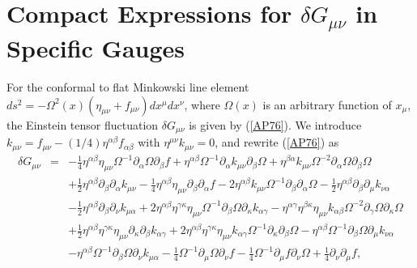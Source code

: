 \section{Compact Expressions for $\delta G_{\mu\nu}$ in Specific Gauges}
\label{s:compact_expressions_ein}


For the conformal to flat Minkowski line element  $ds^2=- \Omega^2(x)(\eta_{\mu\nu}+f_{\mu\nu})dx^{\mu}dx^{\nu}$, where $\Omega(x)$ is an arbitrary function of $x_{\mu}$, the Einstein tensor fluctuation  $\delta G_{\mu\nu}$ is given by (\ref{AP76}). We introduce $k_{\mu\nu}=f_{\mu\nu}-(1/4)\eta^{\alpha\beta}f_{\alpha\beta}$ with $\eta^{\mu\nu}k_{\mu\nu}=0$, and rewrite (\ref{AP76}) as 
%
\begin{eqnarray}
\delta G_{\mu\nu}&=&- \tfrac{1}{4} \eta^{\alpha \beta} \eta_{\mu \nu} \Omega^{-1} \partial_{\alpha}\Omega \partial_{\beta}f + \eta^{\alpha \beta} \Omega^{-1} \partial_{\alpha}k_{\mu \nu} \partial_{\beta}\Omega + \eta^{\beta \alpha} k_{\mu \nu} \Omega^{-2} \partial_{\alpha}\Omega \partial_{\beta}\Omega  
\nonumber\\
&&+ \tfrac{1}{2} \eta^{\alpha \beta} \partial_{\beta}\partial_{\alpha}k_{\mu \nu} -  \tfrac{1}{4} \eta^{\alpha \beta} \eta_{\mu \nu} \partial_{\beta}\partial_{\alpha}f 
- 2 \eta^{\alpha \beta} k_{\mu \nu} \Omega^{-1} \partial_{\beta}\partial_{\alpha}\Omega -  \tfrac{1}{2} \eta^{\alpha \beta} \partial_{\beta}\partial_{\mu}k_{\nu \alpha}  
\nonumber\\
&&-  \tfrac{1}{2} \eta^{\alpha \beta} \partial_{\beta}\partial_{\nu}k_{\mu \alpha} + 2 \eta^{\alpha \beta} \eta^{\gamma \kappa} \eta_{\mu \nu} \Omega^{-1} \partial_{\beta}\Omega \partial_{\kappa}k_{\alpha \gamma} 
-  \eta^{\alpha \gamma} \eta^{\beta \kappa} \eta_{\mu \nu} k_{\alpha \beta} \Omega^{-2} \partial_{\gamma}\Omega \partial_{\kappa}\Omega 
\nonumber\\
&& + \tfrac{1}{2} \eta^{\alpha \beta} \eta^{\gamma \kappa} \eta_{\mu \nu} \partial_{\kappa}\partial_{\beta}k_{\alpha \gamma} + 2 \eta^{\alpha \beta} \eta^{\gamma \kappa} \eta_{\mu \nu} k_{\alpha \gamma} \Omega^{-1} \partial_{\kappa}\partial_{\beta}\Omega -  \eta^{\alpha \beta} \Omega^{-1} \partial_{\beta}\Omega \partial_{\mu}k_{\nu \alpha} 
\nonumber\\
&&-  \eta^{\alpha \beta} \Omega^{-1} \partial_{\beta}\Omega \partial_{\nu}k_{\mu \alpha} -  \tfrac{1}{4} \Omega^{-1} \partial_{\mu}\Omega \partial_{\nu}f -  \tfrac{1}{4} \Omega^{-1} \partial_{\mu}f \partial_{\nu}\Omega + \tfrac{1}{4} \partial_{\nu}\partial_{\mu}f,
\label{D1}
\end{eqnarray}
